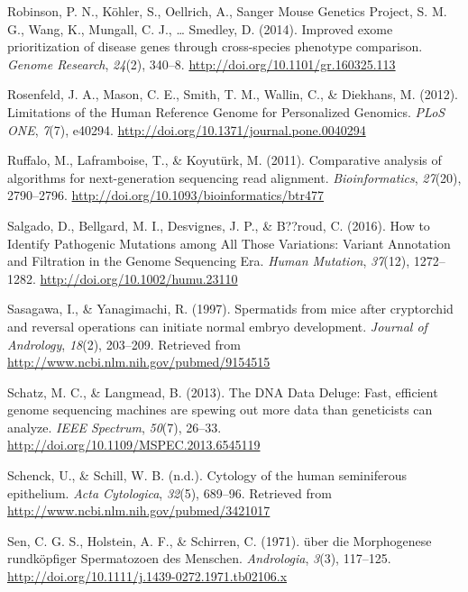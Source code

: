 \documentclass[12pt,twoside]{reedthesis}
\theoremstyle{definition}
\theoremstyle{definition}
\theoremstyle{remark}
\begin{document}
  \hypertarget{ref-Robinson2014}{}
  Robinson, P. N., Köhler, S., Oellrich, A., Sanger Mouse Genetics
  Project, S. M. G., Wang, K., Mungall, C. J., \ldots{} Smedley, D.
  (2014). Improved exome prioritization of disease genes through
  cross-species phenotype comparison. \emph{Genome Research},
  \emph{24}(2), 340--8. \url{http://doi.org/10.1101/gr.160325.113}
  
  \hypertarget{ref-Rosenfeld2012}{}
  Rosenfeld, J. A., Mason, C. E., Smith, T. M., Wallin, C., \& Diekhans,
  M. (2012). Limitations of the Human Reference Genome for Personalized
  Genomics. \emph{PLoS ONE}, \emph{7}(7), e40294.
  \url{http://doi.org/10.1371/journal.pone.0040294}
  
  \hypertarget{ref-Ruffalo2011}{}
  Ruffalo, M., Laframboise, T., \& Koyutürk, M. (2011). Comparative
  analysis of algorithms for next-generation sequencing read alignment.
  \emph{Bioinformatics}, \emph{27}(20), 2790--2796.
  \url{http://doi.org/10.1093/bioinformatics/btr477}
  
  \hypertarget{ref-Salgado2016}{}
  Salgado, D., Bellgard, M. I., Desvignes, J. P., \& B??roud, C. (2016).
  How to Identify Pathogenic Mutations among All Those Variations: Variant
  Annotation and Filtration in the Genome Sequencing Era. \emph{Human
  Mutation}, \emph{37}(12), 1272--1282.
  \url{http://doi.org/10.1002/humu.23110}
  
  \hypertarget{ref-Sasagawa}{}
  Sasagawa, I., \& Yanagimachi, R. (1997). Spermatids from mice after
  cryptorchid and reversal operations can initiate normal embryo
  development. \emph{Journal of Andrology}, \emph{18}(2), 203--209.
  Retrieved from \url{http://www.ncbi.nlm.nih.gov/pubmed/9154515}
  
  \hypertarget{ref-Schatz2013}{}
  Schatz, M. C., \& Langmead, B. (2013). The DNA Data Deluge: Fast,
  efficient genome sequencing machines are spewing out more data than
  geneticists can analyze. \emph{IEEE Spectrum}, \emph{50}(7), 26--33.
  \url{http://doi.org/10.1109/MSPEC.2013.6545119}
  
  \hypertarget{ref-Schenck}{}
  Schenck, U., \& Schill, W. B. (n.d.). Cytology of the human seminiferous
  epithelium. \emph{Acta Cytologica}, \emph{32}(5), 689--96. Retrieved
  from \url{http://www.ncbi.nlm.nih.gov/pubmed/3421017}
  
  \hypertarget{ref-Sen2009}{}
  Sen, C. G. S., Holstein, A. F., \& Schirren, C. (1971). über die
  Morphogenese rundköpfiger Spermatozoen des Menschen. \emph{Andrologia},
  \emph{3}(3), 117--125.
  \url{http://doi.org/10.1111/j.1439-0272.1971.tb02106.x}
  
\end{document}
